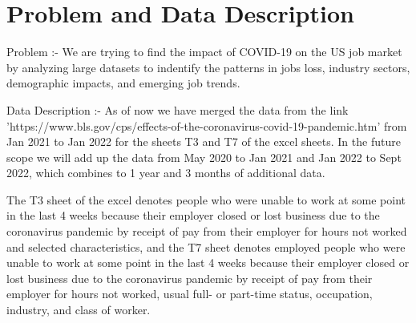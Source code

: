 \documentclass[fleqn,10pt]{SelfArx} %
\affiliation{\textsuperscript{1}\textit{Luddy School of Informatics, Computing, and Engineering, Indiana University, Bloomington, IN, USA}} %
\begin{document}
\flushbottom %

\maketitle %

\tableofcontents %

\thispagestyle{empty} %






\section{Problem and Data Description} %

Problem :- We are trying to find the impact of COVID-19 on the US job market by analyzing large datasets to indentify the patterns in jobs loss, industry sectors, demographic impacts, and emerging job trends.

Data Description :- As of now we have merged the data from the link 'https://www.bls.gov/cps/effects-of-the-coronavirus-covid-19-pandemic.htm' from Jan 2021 to Jan 2022 for the sheets T3 and T7 of the excel sheets. In the future scope we will add up the data from May 2020 to Jan 2021 and Jan 2022 to Sept 2022, which combines to 1 year and 3 months of additional data.

The T3 sheet of the excel denotes people who were unable to work at some point in the last 4 weeks because their employer closed or lost business due to the coronavirus pandemic by receipt of pay from their employer for hours not worked and selected characteristics, and the T7 sheet denotes employed people who were unable to work at some point in the last 4 weeks because their employer closed or lost business due to the coronavirus pandemic by receipt of pay from their employer for hours not worked, usual full- or part-time status, occupation, industry, and class of worker.

\bigskip
\bigskip
\end{document}
